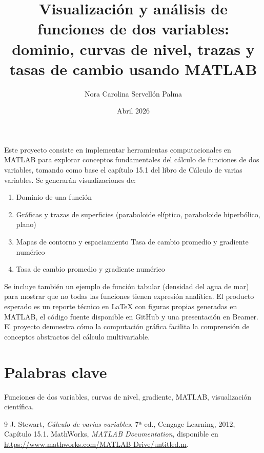 \documentclass[12pt,letterpaper]{article}
\title{\textbf{Visualización y análisis de funciones de dos variables: dominio, curvas de nivel, trazas y tasas de cambio usando MATLAB}}
\author{Nora Carolina Servellón Palma}
\date{Abril 2026}
\begin{document}
\maketitle


\vspace{0.5cm}

Este proyecto consiste en implementar herramientas computacionales en MATLAB para explorar conceptos fundamentales del cálculo de funciones de dos variables, tomando como base el capítulo 15.1 del libro de Cálculo de varias variables. Se generarán visualizaciones de:
\begin{enumerate}
    \item Dominio de una función
    \item Gráficas y trazas de superficies (paraboloide elíptico, paraboloide hiperbólico, plano)
    \item Mapas de contorno y espaciamiento
Tasa de cambio promedio y gradiente numérico
\item Tasa de cambio promedio y gradiente numérico
\end{enumerate}

Se incluye también un ejemplo de función tabular (densidad del agua de mar) para mostrar que no todas las funciones tienen expresión analítica. El producto esperado es un reporte técnico en LaTeX con figuras propias generadas en MATLAB, el código fuente disponible en GitHub y una presentación en Beamer. El proyecto demuestra cómo la computación gráfica facilita la comprensión de conceptos abstractos del cálculo multivariable.

\vspace{1cm}

\section*{Palabras clave}
Funciones de dos variables, curvas de nivel, gradiente, MATLAB, visualización científica.

\begin{thebibliography}{9}
  J. Stewart, \emph{Cálculo de varias variables}, 7ª ed., Cengage Learning, 2012, Capítulo 15.1.
  MathWorks, \emph{MATLAB Documentation}, disponible en \url{https://www.mathworks.com/MATLAB Drive/untitled.m}.
\end{thebibliography}
\end{document}
